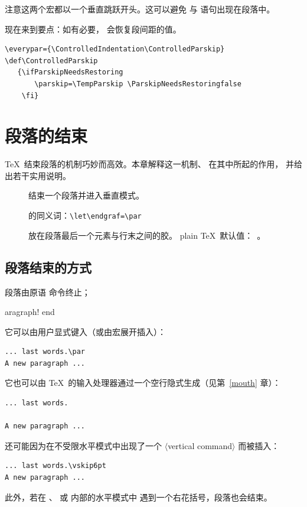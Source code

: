 \documentclass[a4paper]{rapport3}
\def\gr#1{$\langle$#1$\rangle$}\def\key#1{{\tt#1}}
\newenvironment{inventory}{\begin{description}}{\end{description}}
\def\term#1\par{\index{#1}}
\begin{document}
注意这两个宏都以一个垂直跳跃开头。这可以避免
 与  语句出现在段落中。 

现在来到要点：如有必要， 会恢复段间距的值。
\begin{verbatim}
\everypar={\ControlledIndentation\ControlledParskip}
\def\ControlledParskip
   {\ifParskipNeedsRestoring
       \parskip=\TempParskip \ParskipNeedsRestoringfalse
    \fi}
\end{verbatim}

\endofchapter
\chapter{段落的结束}\label{par:end}

\TeX\ 结束段落的机制巧妙而高效。本章解释这一机制、 在其中所起的作用，
并给出若干实用说明。

\begin{inventory}
\item [] 
      结束一个段落并进入垂直模式。

\item []
       的同义词：\verb>\let\endgraf=\par>

\item [] 
      放在段落最后一个元素与行末之间的胶。
      plain \TeX\ 默认值：~。
\end{inventory}

\section{段落结束的方式}

段落由原语  命令终止；\term paragraph! end\par
它可以由用户显式键入（或由宏展开插入）：\begin{verbatim}
... last words.\par
A new paragraph ...
\end{verbatim}
它也可以由 \TeX\ 的输入处理器通过一个空行隐式生成（见第~\ref{mouth} 章）：\begin{verbatim}
... last words.

A new paragraph ...
\end{verbatim} 
 还可能因为在不受限水平模式中出现了一个 \gr{vertical command}
而被插入：\begin{verbatim}
... last words.\vskip6pt
A new paragraph ...
\end{verbatim}
此外，若在 、 或  内部的水平模式中
遇到一个右花括号，段落也会结束。
\end{document}
